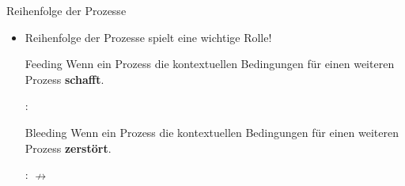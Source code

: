\begin{frame}{Reihenfolge der Prozesse}

\begin{itemize}
	\item Reihenfolge der Prozesse spielt eine wichtige Rolle!

	\begin{block}{Feeding}
	Wenn ein Prozess die kontextuellen Bedingungen für einen weiteren Prozess \textbf{schafft}.	

	\end{block}

	\ea {}:  \ras \textipa{[ha:k\textsyllabic{n}]} \ras \textipa{[ha:k\textsyllabic{N}]}
	\z

	\begin{block}{Bleeding}
	Wenn ein Prozess die kontextuellen Bedingungen für einen weiteren Prozess \textbf{zerstört}.
	\end{block}

	\ea {}:  \ras \textipa{[g@.zaNg]} \ras \textipa{[g@.zaN]} $\nrightarrow$ \textipa{[g@.zaNk]}
	\z
	
\end{itemize}

\end{frame}



